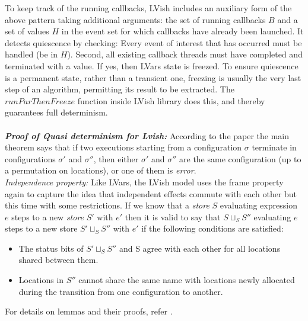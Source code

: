 \documentclass[twocolumn]{article}
\begin{document}
To keep track of the running callbacks, LVish includes an auxiliary form of the above pattern taking additional arguments: the set of running callbacks $B$ and a set of values $H$ in the event set for which callbacks have already been launched. It detects quiescence by checking: Every event of interest that has occurred must be handled (be in $H$). Second, all existing callback threads must have completed and terminated with a value. If yes, then LVars state is freezed. To ensure quiescence is a permanent state, rather than a transient one, freezing is usually the very last step of an algorithm, permitting its result to be extracted. The $runParThenFreeze$ function inside LVish library does this, and thereby guarantees full determinism.\\ \\
\textbf{\textit{Proof of Quasi determinism for Lvish:}} According to the paper\cite{lkuper2} the main theorem says that if two executions starting from a configuration $\sigma$ terminate in configurations $\sigma{'}$ and $\sigma{''}$, then either $\sigma{'}$ and $\sigma{''}$ are the same configuration (up to a permutation on locations), or one of them is \emph{error}.\\
\textit{Independence property:} Like LVars, the LVish model uses the frame property again to capture the idea that independent effects commute with each other but this time with some restrictions. If we know that a \emph{store} $S$ evaluating expression $e$ steps to a new \emph{store} $S{'}$ with $e{'}$ then it is valid to say that $S\sqcup_{S}S''$ evaluating $e$ steps to a new store $S'\sqcup_{S}S''$ with $e'$ if the following conditions are satisfied:
\begin{itemize}
\item The status bits of $S'\sqcup_{S}S''$ and S agree with each other for all locations shared between them.
\item Locations in $S''$ cannot share the same name with locations newly allocated during the transition from one configuration
to another.
\end{itemize}
For details on lemmas and their proofs, refer \cite{kuper}\cite{lkuper2}.
\end{document}
